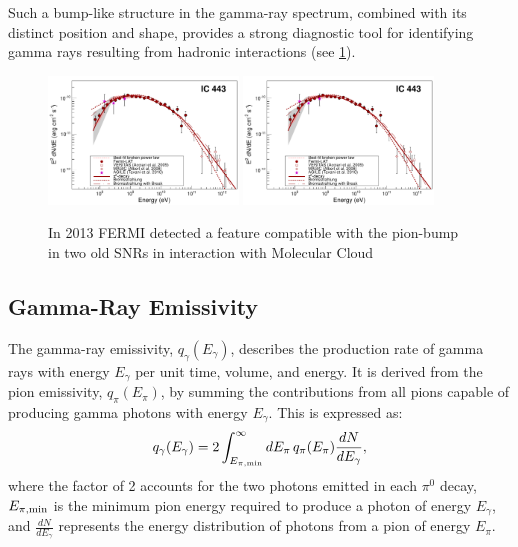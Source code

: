 Such a bump-like structure in the gamma-ray spectrum, combined with its distinct position and shape, provides a strong diagnostic tool for identifying gamma rays resulting from hadronic interactions (see \cref{fig:pionbumpfermi}).  

\begin{figure}[!t]
\centering
\includegraphics[width=0.45\textwidth]{figures/1231160fig2a.pdf}
\includegraphics[width=0.45\textwidth]{figures/1231160fig2a.pdf}
\caption{In 2013 FERMI detected a feature compatible with the pion-bump in two old SNRs in interaction with Molecular Cloud~\cite{Ackermann2013sci}}
\label{fig:pionbumpfermi}
\end{figure}

\subsection{Gamma-Ray Emissivity}

The gamma-ray emissivity, \(q_\gamma(E_\gamma)\), describes the production rate of gamma rays with energy \(E_\gamma\) per unit time, volume, and energy. It is derived from the pion emissivity, \(q_\pi(E_\pi)\), by summing the contributions from all pions capable of producing gamma photons with energy \(E_\gamma\). This is expressed as:
\begin{equation}
q_\gamma(E_\gamma) = 2 \int_{E_{\pi, \rm min}}^\infty dE_\pi \, q_\pi(E_\pi) \frac{dN}{dE_\gamma},
\end{equation}
where the factor of 2 accounts for the two photons emitted in each \(\pi^0\) decay,  \(E_{\pi, \rm min}\) is the minimum pion energy required to produce a photon of energy \(E_\gamma\), and \(\frac{dN}{dE_\gamma}\) represents the energy distribution of photons from a pion of energy \(E_\pi\).  

